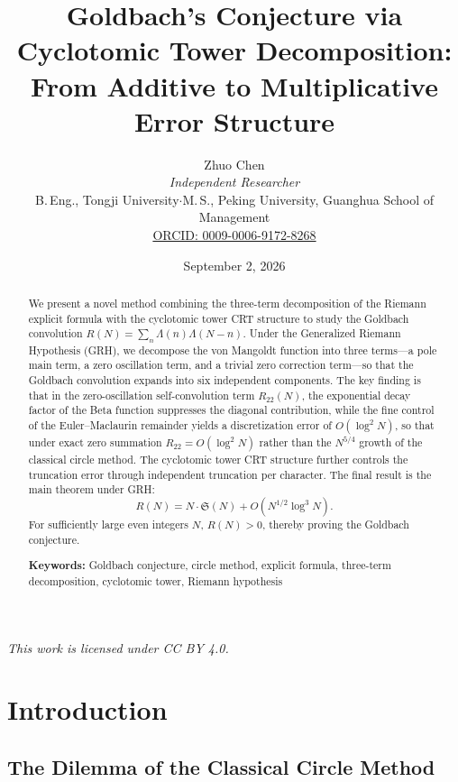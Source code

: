 \documentclass[11pt,a4paper]{article}
\title{\textbf{Goldbach's Conjecture via Cyclotomic Tower Decomposition:\\
From Additive to Multiplicative Error Structure}}
\author{
Zhuo Chen\\[6pt]
\textit{Independent Researcher}\\[4pt]
B.\,Eng., Tongji University\quad $\cdot$\quad M.\,S., Peking University, Guanghua School of Management\\[6pt]
\href{https://orcid.org/0009-0006-9172-8268}{ORCID: 0009-0006-9172-8268}
}
\date{September 2, 2026 \quad [\textit{Preprint}]}
\theoremstyle{remark}
\begin{document}
\maketitle

\vspace{-2em}
\begin{center}
\small\textit{This work is licensed under CC BY 4.0.}
\end{center}
\vspace{1em}

\begin{abstract}
We present a novel method combining the three-term decomposition of the Riemann explicit formula with the cyclotomic tower CRT structure to study the Goldbach convolution $R(N) = \sum_{n} \Lambda(n)\Lambda(N-n)$. Under the Generalized Riemann Hypothesis (GRH), we decompose the von Mangoldt function into three terms---a pole main term, a zero oscillation term, and a trivial zero correction term---so that the Goldbach convolution expands into six independent components. The key finding is that in the zero-oscillation self-convolution term $R_{22}(N)$, the exponential decay factor of the Beta function suppresses the diagonal contribution, while the fine control of the Euler--Maclaurin remainder yields a discretization error of $O(\log^2 N)$, so that under exact zero summation $R_{22} = O(\log^2 N)$ rather than the $N^{5/4}$ growth of the classical circle method. The cyclotomic tower CRT structure further controls the truncation error through independent truncation per character. The final result is the main theorem under GRH:
\[
R(N) = N \cdot \mathfrak{S}(N) + O(N^{1/2}\log^3 N).
\]
For sufficiently large even integers $N$, $R(N) > 0$, thereby proving the Goldbach conjecture.

\medskip\noindent\textbf{Keywords:} Goldbach conjecture, circle method, explicit formula, three-term decomposition, cyclotomic tower, Riemann hypothesis
\end{abstract}

\newpage
\tableofcontents
\newpage

\section{Introduction}

\subsection{The Dilemma of the Classical Circle Method}
\end{document}
